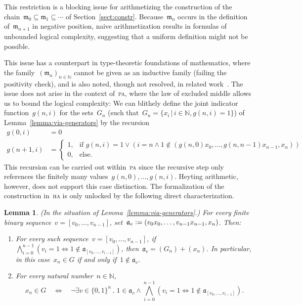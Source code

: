 \documentclass[com,11pt,crcready]{iosart2x}
\theoremstyle{definition}
\theoremstyle{plain}
\newtheorem{lemma}[definition]{Lemma}
\theoremstyle{remark}
\newcommand{\aaa}{\mathfrak{a}}
\newcommand{\mmm}{\mathfrak{m}}
\newcommand{\NN}{\mathbb{N}}
\newcommand{\defeq}{\vcentcolon=}
\renewcommand{\_}{\mathpunct{.}\,}
\begin{document}
This restriction is a blocking issue for arithmetizing the
construction of the chain~$\mmm_0 \subseteq \mmm_1 \subseteq \cdots$
of Section~\ref{sect:constr}. Because~$\mmm_n$ occurs in the
definition of~$\mmm_{n+1}$ in negative position, naive arithmetization
results in formulas of unbounded logical complexity, suggesting that
a uniform definition might not be possible.

This issue has a counterpart in type-theoretic foundations of mathematics,
where the family~$(\mmm_n)_{n \in \NN}$ cannot be given as an inductive family
(failing the positivity check), and is also noted, though not resolved, in
related work~\cite[p.~11]{herbelin-ilik:henkin}.
The issue does not arise in the context of~\textsc{pa}, where the law of
excluded middle allows us to bound the logical complexity: We can blithely define
the joint indicator function~$g(n,i)$ for the sets~$G_n$ (such that~$G_n = \{
x_i \,|\, i \in \NN, g(n,i) = 1 \}$) of Lemma~\ref{lemma:via-generators} by the recursion
\begin{align*}
  g(0,i) &= 0 \\
  g(n+1,i) &= \begin{cases}
    1, & \text{if $g(n,i) = 1 \vee (i = n \wedge 1 \not\in
    (g(n,0)x_0,\ldots,g(n,n{-}1)x_{n-1},x_n))$} \\
    0, & \text{else.}
  \end{cases}
\end{align*}
This recursion can be carried out within~\textsc{pa} since the recursive step
only references the finitely many values~$g(n,0),\ldots,g(n,i)$.
Heyting arithmetic, however, does not support this case distinction. The
formalization of the construction in~\textsc{ha} is only unlocked by the following
direct characterization.

\begin{lemma}\label{lemma:uniform-char}(In the situation of Lemma~\ref{lemma:via-generators}.)
For every finite binary sequence~$v = [v_0,\ldots,v_{n-1}]$, set~$\aaa_v
\defeq (v_0x_0,\ldots,v_{n-1}x_{n-1},x_n)$. Then:
\begin{enumerate}
\item For every such sequence~$v = [v_0,\ldots,v_{n-1}]$, if
$\bigwedge_{i=0}^{n-1} (v_i = 1 \Leftrightarrow 1 \not\in \aaa_{[v_0,\ldots,v_{i-1}]})$,
then~$\aaa_v = (G_n) + (x_n)$.
In particular, in this case~$x_n \in G$ if and only if~$1 \not\in \aaa_v$.
\item For every natural number~$n \in \NN$,
\vspace*{-1.2em}
\[ x_n \in G \quad\Longleftrightarrow\quad \neg
  \exists v \in \{0,1\}^n\_
    1 \in \aaa_v \wedge
      \bigwedge_{i=0}^{n-1} (v_i = 1 \Leftrightarrow 1 \not\in \aaa_{[v_0,\ldots,v_{i-1}]}). \]
\end{enumerate}
\end{lemma}
\end{document}
